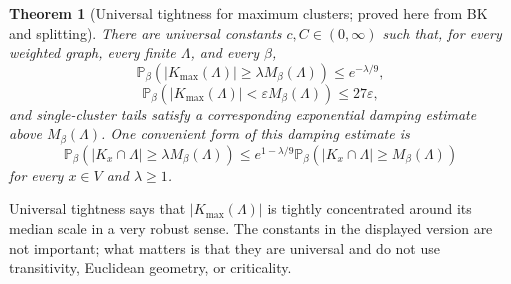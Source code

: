 \documentclass[11pt,reqno]{book}
\numberwithin{equation}{chapter}
\theoremstyle{plain}
\newtheorem{theorem}{Theorem}[chapter]
\theoremstyle{definition}
\theoremstyle{remark}
\renewcommand{\P}{\mathbb P}
\newcommand{\eps}{\varepsilon}
\newcommand{\1}{\mathbf 1}
\begin{document}
\begin{theorem}[Universal tightness for maximum clusters; proved here from BK and splitting]
There are universal constants \(c,C\in(0,\infty)\) such that, for every
weighted graph, every finite \(\Lambda\), and every \(\beta\),
\[
  \P_\beta(|K_{\max}(\Lambda)|\geq \lambda M_\beta(\Lambda))
  \leq e^{-\lambda/9},
\]
\[
  \P_\beta(|K_{\max}(\Lambda)|<\eps M_\beta(\Lambda))
  \leq 27\eps,
\]
and single-cluster tails satisfy a corresponding exponential damping estimate above $M_\beta(\Lambda)$.
One convenient form of this damping estimate is
\[
  \P_\beta(|K_x\cap\Lambda|\geq \lambda M_\beta(\Lambda))
  \leq
  e^{1-\lambda/9}
  \P_\beta(|K_x\cap\Lambda|\geq M_\beta(\Lambda))
\]
for every $x\in V$ and $\lambda\geq1$.
\end{theorem}

Universal tightness says that \( |K_{\max}(\Lambda)|\) is tightly
concentrated around its median scale in a very robust sense. The constants in
the displayed version are not important; what matters is that they are
universal and do not use transitivity, Euclidean geometry, or criticality.
\end{document}
